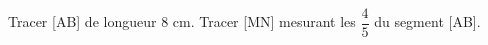 \documentclass[exercice]{thedocument}%
\begin{document}
%
Tracer [AB] de longueur 8 cm. Tracer [MN] mesurant les $\dfrac45$
du segment [AB].
\answerspace{5cm}
\end{document}
